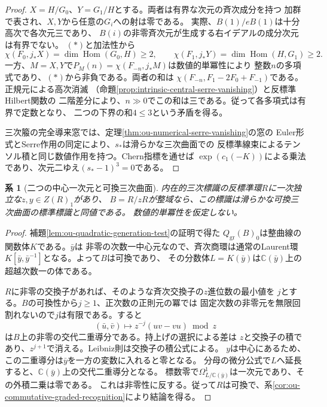 \documentclass[11pt,a4paper]{ltjsarticle}
\newtheorem{corollary}[theorem]{系}
\theoremstyle{definition}
\begin{document}
\begin{proof}
$X=H/G_0$、$Y=G_1/H$とする。両者は有界な次元の斉次成分を持つ
加群で表され、$X,Y$から任意の$G_i$への射は零である。
実際、$B(1)/eB(1)$は十分高次で各次元三であり、
$B(i)$の非零斉次元が生成する右イデアルの成分次元は有界でない。
$(*)$と加法性から
\[
 \chi(F_0,j_*X)=\dim\operatorname{Hom}(G_0,H)\ge2,\qquad
 \chi(F_1,j_*Y)=\dim\operatorname{Hom}(H,G_1)\ge2.
\]
一方、$M=X,Y$で$P_M(n)=\chi(F_{-n},j_*M)$は数値的単冪性により
整数$n$の多項式であり、$(*)$から非負である。両者の和は
$\chi(F_{-n},F_1-2F_0+F_{-1})$である。正規元による高次消滅
（命題\ref{prop:intrinsic-central-serre-vanishing}）と反標準Hilbert関数の
二階差分により、$n\gg0$でこの和は三である。従って各多項式は有界で定数となり、
二つの下界の和$4\le3$という矛盾を得る。

三次箙の完全導来窓では、定理\ref{thm:ou-numerical-serre-vanishing}の窓の
Euler形式とSerre作用の同定により、$s_*$は滑らかな三次曲面での
反標準線束によるテンソル積と同じ数値作用を持つ。Chern指標を通せば
$\exp(c_1(-K))$による乗法であり、次元二ゆえ$(s_*-1)^3=0$である。
\end{proof}

\begin{corollary}[二つの中心一次元と可換三次曲面]
\label{cor:ou-central-pencil-integral}
内在的三次標識の反標準環$R$に一次独立な$z,y\in Z(R)_1$があり、
$B=R/zR$が整域なら、この標識は滑らかな可換三次曲面の標準標識と同値である。
数値的単冪性を仮定しない。
\end{corollary}
\begin{proof}
補題\ref{lem:ou-quadratic-generation-test}の証明で得た
$Q_{\mathrm{gr}}(B)_0$は整曲線の関数体$K$である。$\bar y$は
非零の次数一中心元なので、斉次商環は通常のLaurent環
$K[\bar y,\bar y^{-1}]$となる。よって$B$は可換であり、
その分数体$L=K(\bar y)$は$\mathbb C(\bar y)$上の超越次数一の体である。

$R$に非零の交換子があれば、そのような斉次交換子の$z$進位数の最小値を
$j$とする。$B$の可換性から$j\ge1$、正次数の正則元の冪では
固定次数の非零元を無限回割れないので$j$は有限である。すると
\[
 (\bar u,\bar v)\longmapsto z^{-j}(uv-vu)\bmod z
\]
は$B$上の非零の交代二重導分である。持上げの選択による差は
$z$と交換子の積であり、$z^{j+1}$で消える。Leibniz則は交換子の積公式による。
$y$は中心にあるため、この二重導分は$\bar y$を一方の変数に入れると零となる。
分母の微分公式で$L$へ延長すると、$\mathbb C(\bar y)$上の交代二重導分となる。
標数零で$\Omega^1_{L/\mathbb C(\bar y)}$は一次元であり、その外積二乗は零である。
これは非零性に反する。従って$R$は可換で、系\ref{cor:ou-commutative-graded-recognition}により結論を得る。
\end{proof}
\end{document}
